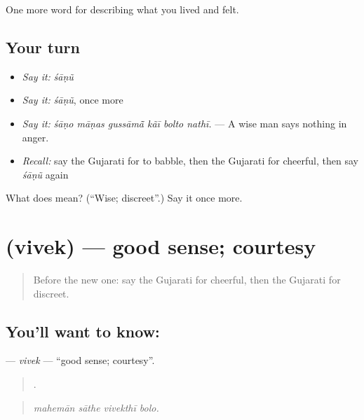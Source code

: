 \begin{grammarlens}[title={What you've built}]
One more word for describing what you lived and felt.
\end{grammarlens}

\subsection*{Your turn}
\begin{itemize}
\raggedright
  \item \emph{Say it:} \emph{śāṇũ}
  \item \emph{Say it:} \emph{śāṇũ}, once more
  \item \emph{Say it:} \emph{śāṇo māṇas gussāmā̃ kãī bolto nathī.} — A wise man says nothing in anger.
  \item \emph{Recall:} say the Gujarati for to babble, then the Gujarati for cheerful, then say \emph{śāṇũ} again
\end{itemize}

\begin{tcolorbox}[breakable,colback=teal!4,colframe=teal!35!black,title={Before you move on}]
What does  mean? (\textquotedblleft{}Wise; discreet\textquotedblright{}.) Say it once more.
\end{tcolorbox}
\section[\texorpdfstring{\gu{વિવેક} (vivek)}{વિવેક (vivek)}]{ (vivek) — good sense; courtesy}

\label{lesson:GU-C464-vivek}



\begin{quote}
Before the new one: say the Gujarati for cheerful, then the Gujarati for discreet.
\end{quote}

\subsection*{You'll want to know: }
\textbf{} — \emph{vivek} — \textquotedblleft{}good sense; courtesy\textquotedblright{}.

\begin{quote}
   .
\end{quote}

\begin{quote}
\emph{mahemān sāthe vivekthī bolo.}
\end{quote}

